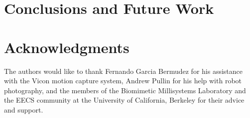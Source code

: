 \documentclass{aamas2013}
\begin{document}
\section{Conclusions and Future Work}
\section{Acknowledgments}
The authors would like to thank Fernando Garcia Bermudez for his 
assistance with the Vicon motion capture system, Andrew Pullin for his 
help with robot photography, and the members of the Biomimetic 
Millisystems Laboratory and the EECS community at the University of 
California, Berkeley for their advice and support.






\end{document}
